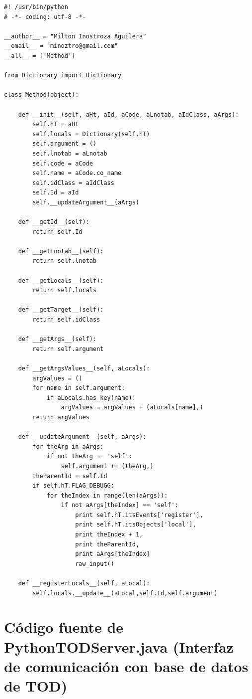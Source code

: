 \documentclass[12pt,legalpaper]{report}
\begin{document}
\begin{singlespace}
\begin{lstlisting}[style=Python]
#! /usr/bin/python
# -*- coding: utf-8 -*-

__author__ = "Milton Inostroza Aguilera"
__email__ = "minoztro@gmail.com"
__all__ = ['Method']

from Dictionary import Dictionary

class Method(object):

    def __init__(self, aHt, aId, aCode, aLnotab, aIdClass, aArgs):
        self.hT = aHt
        self.locals = Dictionary(self.hT)
        self.argument = ()
        self.lnotab = aLnotab
        self.code = aCode
        self.name = aCode.co_name
        self.idClass = aIdClass
        self.Id = aId
        self.__updateArgument__(aArgs)

    def __getId__(self):
        return self.Id

    def __getLnotab__(self):
        return self.lnotab

    def __getLocals__(self):
        return self.locals

    def __getTarget__(self):
        return self.idClass

    def __getArgs__(self):
        return self.argument
    
    def __getArgsValues__(self, aLocals):
        argValues = ()
        for name in self.argument:
            if aLocals.has_key(name):
                argValues = argValues + (aLocals[name],)
        return argValues

    def __updateArgument__(self, aArgs):
        for theArg in aArgs:
            if not theArg == 'self':
                self.argument += (theArg,)
        theParentId = self.Id
        if self.hT.FLAG_DEBUGG:
            for theIndex in range(len(aArgs)):
                if not aArgs[theIndex] == 'self':
                    print self.hT.itsEvents['register'],
                    print self.hT.itsObjects['local'],
                    print theIndex + 1,
                    print theParentId,
                    print aArgs[theIndex]
                    raw_input() 
                    
    def __registerLocals__(self, aLocal):
        self.locals.__update__(aLocal,self.Id,self.argument)
\end{lstlisting}
\end{singlespace}


	\section{Código fuente de PythonTODServer.java (Interfaz de comunicación con base de datos de TOD)}
	
\end{document}
